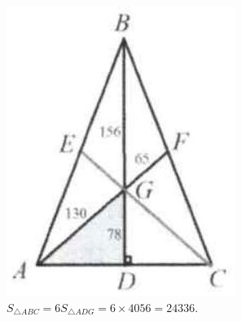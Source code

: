 \documentclass{article}
\begin{document}
\centering
\includegraphics[width=\textwidth]{images/reasoning_image_1.jpg}\\
\(S_{\triangle A B C}=6 S_{\triangle A D G}=6 \times 4056=24336\).\\
\end{document}
